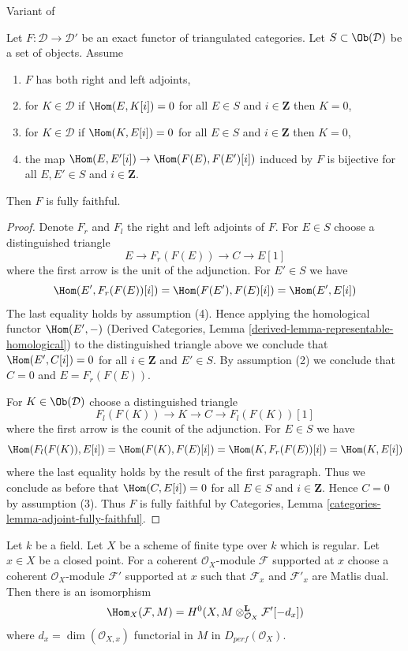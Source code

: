 \begin{lemma}
\label{lemma-get-fully-faithful}
\begin{reference}
Variant of \cite[Lemma 2.15]{Orlov-K3}
\end{reference}
Let $F : \mathcal{D} \to \mathcal{D}'$ be an exact functor of
triangulated categories. Let $S \subset \Ob(\mathcal{D})$ be
a set of objects. Assume
\begin{enumerate}
\item $F$ has both right and left adjoints,
\item for $K \in \mathcal{D}$ if $\Hom(E, K[i]) = 0$ for all
$E \in S$ and $i \in \mathbf{Z}$ then $K = 0$,
\item for $K \in \mathcal{D}$ if $\Hom(K, E[i]) = 0$ for all
$E \in S$ and $i \in \mathbf{Z}$ then $K = 0$,
\item the map $\Hom(E, E'[i]) \to \Hom(F(E), F(E')[i])$ induced by $F$
is bijective for all $E, E' \in S$ and $i \in \mathbf{Z}$.
\end{enumerate}
Then $F$ is fully faithful.
\end{lemma}

\begin{proof}
Denote $F_r$ and $F_l$ the right and left adjoints of $F$. For
$E \in S$ choose a distinguished triangle
$$
E \to F_r(F(E)) \to C \to E[1]
$$
where the first arrow is the unit of the adjunction. For $E' \in S$ we have
$$
\Hom(E', F_r(F(E))[i]) = \Hom(F(E'), F(E)[i]) = \Hom(E', E[i])
$$
The last equality holds by assumption (4).
Hence applying the homological functor $\Hom(E', -)$
(Derived Categories, Lemma \ref{derived-lemma-representable-homological})
to the distinguished triangle above we conclude that $\Hom(E', C[i]) = 0$
for all $i \in \mathbf{Z}$ and $E' \in S$. By assumption (2) we conclude
that $C = 0$ and $E = F_r(F(E))$.

\medskip\noindent
For $K \in \Ob(\mathcal{D})$ choose a distinguished triangle
$$
F_l(F(K)) \to K \to C \to F_l(F(K))[1]
$$
where the first arrow is the counit of the adjunction. For $E \in S$
we have
$$
\Hom(F_l(F(K)), E[i]) = \Hom(F(K), F(E)[i]) =
\Hom(K, F_r(F(E))[i]) = \Hom(K, E[i])
$$
where the last equality holds by the result of the first paragraph.
Thus we conclude as before that $\Hom(C, E[i]) = 0$ for all $E \in S$
and $i \in \mathbf{Z}$. Hence $C = 0$ by assumption (3).
Thus $F$ is fully faithful by Categories, Lemma
\ref{categories-lemma-adjoint-fully-faithful}.
\end{proof}

\begin{lemma}
\label{lemma-duality-at-point}
Let $k$ be a field. Let $X$ be a scheme of finite type over $k$ which
is regular. Let $x \in X$ be a closed point. For a coherent
$\mathcal{O}_X$-module $\mathcal{F}$ supported at $x$ choose
a coherent $\mathcal{O}_X$-module $\mathcal{F}'$ supported at $x$
such that $\mathcal{F}_x$ and $\mathcal{F}'_x$ are Matlis dual.
Then there is an isomorphism
$$
\Hom_X(\mathcal{F}, M) =
H^0(X, M \otimes_{\mathcal{O}_X}^\mathbf{L} \mathcal{F}'[-d_x])
$$
where $d_x = \dim(\mathcal{O}_{X, x})$
functorial in $M$ in $D_{perf}(\mathcal{O}_X)$.
\end{lemma}

